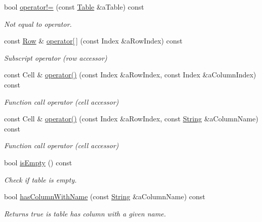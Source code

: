 \begin{DoxyCompactItemize}
bool \hyperlink{classlibrary_1_1core_1_1ctnr_1_1_table_ab31f43d4e0081b9d3edd03c22115d17b}{operator!=} (const \hyperlink{classlibrary_1_1core_1_1ctnr_1_1_table}{Table} \&a\+Table) const
\begin{DoxyCompactList}\small\item\em Not equal to operator. \end{DoxyCompactList}\item 
const \hyperlink{classlibrary_1_1core_1_1ctnr_1_1table_1_1_row}{Row} \& \hyperlink{classlibrary_1_1core_1_1ctnr_1_1_table_ae0b163e13fe6dc832c103ca7f89a0ca3}{operator\mbox{[}$\,$\mbox{]}} (const Index \&a\+Row\+Index) const
\begin{DoxyCompactList}\small\item\em Subscript operator (row accessor) \end{DoxyCompactList}\item 
const Cell \& \hyperlink{classlibrary_1_1core_1_1ctnr_1_1_table_a4eb003dcbe4c1c127adf473465e70bef}{operator()} (const Index \&a\+Row\+Index, const Index \&a\+Column\+Index) const
\begin{DoxyCompactList}\small\item\em Function call operator (cell accessor) \end{DoxyCompactList}\item 
const Cell \& \hyperlink{classlibrary_1_1core_1_1ctnr_1_1_table_a3176682f6a0762d2290ca82e4318ab56}{operator()} (const Index \&a\+Row\+Index, const \hyperlink{classlibrary_1_1core_1_1types_1_1_string}{String} \&a\+Column\+Name) const
\begin{DoxyCompactList}\small\item\em Function call operator (cell accessor) \end{DoxyCompactList}\item 
bool \hyperlink{classlibrary_1_1core_1_1ctnr_1_1_table_ae0b9f9ee022ed72e06ed41f324855c1a}{is\+Empty} () const
\begin{DoxyCompactList}\small\item\em Check if table is empty. \end{DoxyCompactList}\item 
bool \hyperlink{classlibrary_1_1core_1_1ctnr_1_1_table_a53d1981ce11ba15cc920addfba23e236}{has\+Column\+With\+Name} (const \hyperlink{classlibrary_1_1core_1_1types_1_1_string}{String} \&a\+Column\+Name) const
\begin{DoxyCompactList}\small\item\em Returns true is table has column with a given name. \end{DoxyCompactList}\item 

\end{DoxyCompactItemize}
